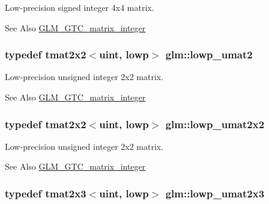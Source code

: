 Low-\/precision signed integer 4x4 matrix. \begin{DoxySeeAlso}{See Also}
\hyperlink{group__gtc__matrix__integer}{G\-L\-M\-\_\-\-G\-T\-C\-\_\-matrix\-\_\-integer} 
\end{DoxySeeAlso}
\hypertarget{group__gtc__matrix__integer_ga0ff71fefa5bfab1462195c3de4f83f67}{
\subsubsection[{lowp\-\_\-umat2}]{\setlength{\rightskip}{0pt plus 5cm}typedef tmat2x2$<$uint, lowp$>$ {\bf glm\-::lowp\-\_\-umat2}}}\label{group__gtc__matrix__integer_ga0ff71fefa5bfab1462195c3de4f83f67}
Low-\/precision unsigned integer 2x2 matrix. \begin{DoxySeeAlso}{See Also}
\hyperlink{group__gtc__matrix__integer}{G\-L\-M\-\_\-\-G\-T\-C\-\_\-matrix\-\_\-integer} 
\end{DoxySeeAlso}
\hypertarget{group__gtc__matrix__integer_ga13b2812e9b0af47e0f498391383d145a}{
\subsubsection[{lowp\-\_\-umat2x2}]{\setlength{\rightskip}{0pt plus 5cm}typedef tmat2x2$<$uint, lowp$>$ {\bf glm\-::lowp\-\_\-umat2x2}}}\label{group__gtc__matrix__integer_ga13b2812e9b0af47e0f498391383d145a}
Low-\/precision unsigned integer 2x2 matrix. \begin{DoxySeeAlso}{See Also}
\hyperlink{group__gtc__matrix__integer}{G\-L\-M\-\_\-\-G\-T\-C\-\_\-matrix\-\_\-integer} 
\end{DoxySeeAlso}
\hypertarget{group__gtc__matrix__integer_ga3af254ecb450000314422b1730afacc0}{
\subsubsection[{lowp\-\_\-umat2x3}]{\setlength{\rightskip}{0pt plus 5cm}typedef tmat2x3$<$uint, lowp$>$ {\bf glm\-::lowp\-\_\-umat2x3}}}\label{group__gtc__matrix__integer_ga3af254ecb450000314422b1730afacc0}
